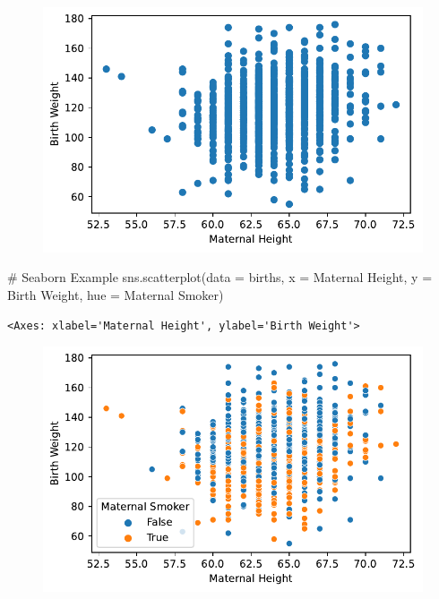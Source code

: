 \documentclass[
  letterpaper,
  DIV=11,
  numbers=noendperiod]{scrreprt}
\newenvironment{Shaded}{\begin{snugshade}}{\end{snugshade}}
\newcommand{\CommentTok}[1]{\textcolor[rgb]{0.37,0.37,0.37}{#1}}
\newcommand{\NormalTok}[1]{\textcolor[rgb]{0.00,0.23,0.31}{#1}}
\newcommand{\OperatorTok}[1]{\textcolor[rgb]{0.37,0.37,0.37}{#1}}
\newcommand{\StringTok}[1]{\textcolor[rgb]{0.13,0.47,0.30}{#1}}
\begin{document}
\begin{figure}[H]

{\centering \includegraphics{visualization_2/visualization_2_files/figure-pdf/cell-7-output-1.pdf}

}

\end{figure}

\begin{Shaded}
\begin{Highlighting}[]
\CommentTok{\# Seaborn Example}
\NormalTok{sns.scatterplot(data }\OperatorTok{=}\NormalTok{ births, x }\OperatorTok{=} \StringTok{\textquotesingle{}Maternal Height\textquotesingle{}}\NormalTok{, y }\OperatorTok{=} \StringTok{\textquotesingle{}Birth Weight\textquotesingle{}}\NormalTok{,}
\NormalTok{                hue }\OperatorTok{=} \StringTok{\textquotesingle{}Maternal Smoker\textquotesingle{}}\NormalTok{)}
\end{Highlighting}
\end{Shaded}

\begin{verbatim}
<Axes: xlabel='Maternal Height', ylabel='Birth Weight'>
\end{verbatim}

\begin{figure}[H]

{\centering \includegraphics{visualization_2/visualization_2_files/figure-pdf/cell-8-output-2.pdf}

}

\end{figure}
\end{document}
